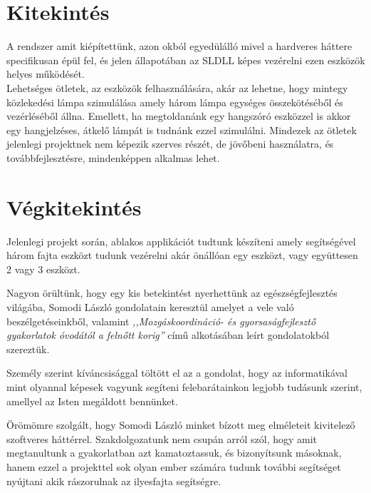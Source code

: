 \documentclass[tocnopagenum]{thesis-ekf}
\theoremstyle{definition}
\theoremstyle{remark}
\begin{document}
	\chapter*{Kitekintés}
	A rendszer amit kiépítettünk, azon okból egyedülálló mivel a hardveres háttere specifikusan épül fel, és jelen állapotában az SLDLL képes vezérelni ezen eszközök helyes működését.
	\\
	Lehetséges ötletek, az eszközök felhasználására, akár az lehetne, hogy mintegy közlekedési lámpa szimulálása amely három lámpa egységes összekötéséből és vezérléséből állna. Emellett, ha megtoldanánk egy hangszóró eszközzel is akkor egy hangjelzéses, átkelő lámpát is tudnánk ezzel szimulálni.
	Mindezek az ötletek jelenlegi projektnek nem képezik szerves részét, de jövőbeni használatra, és továbbfejlesztésre, mindenképpen alkalmas lehet.

	

	\chapter*{Végkitekintés}
	Jelenlegi projekt során, ablakos applikációt tudtunk készíteni amely segítségével három fajta eszközt tudunk vezérelni akár önállóan egy eszközt, vagy együttesen 2 vagy 3 eszközt.

	Nagyon örültünk, hogy egy kis betekintést nyerhettünk az egészségfejlesztés világába, Somodi László gondolatain keresztül amelyet a vele való beszélgetéseinkből, valamint \textit{,,Mozgáskoordináció- és gyorsaságfejlesztő gyakorlatok óvodától a felnőtt korig''} című alkotásában leírt gondolatokból szereztük.
	
	Személy szerint kíváncsisággal töltött el az a gondolat, hogy az informatikával mint olyannal képesek vagyunk segíteni felebarátainkon legjobb tudásunk szerint, amellyel az Isten megáldott bennünket.
	
	Örömömre szolgált, hogy Somodi László minket bízott meg elméleteit kivitelező szoftveres háttérrel. Szakdolgozatunk nem csupán arról szól, hogy amit megtanultunk a gyakorlatban azt kamatoztassuk, és bizonyítsunk másoknak, hanem ezzel a projekttel sok olyan ember számára tudunk további segítséget nyújtani akik rászorulnak az ilyesfajta segítségre.
	
\end{document}
